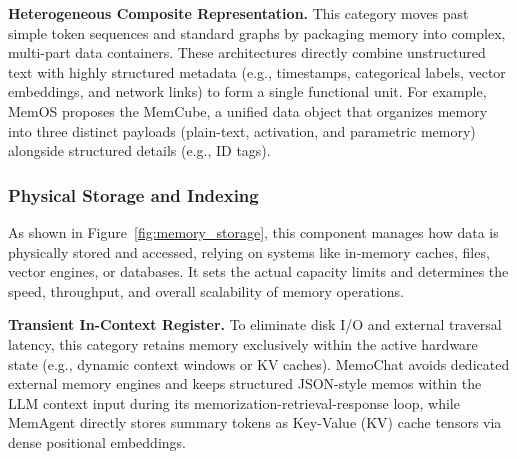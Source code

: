 
\noindent {} \textbf{Heterogeneous Composite Representation.}
This category moves past simple token sequences and standard graphs by packaging memory into complex, multi-part data containers. These architectures directly combine unstructured text with highly structured metadata (e.g., timestamps, categorical labels, vector embeddings, and network links) to form a single functional unit. For example, MemOS proposes the MemCube, a unified data object that organizes memory into three distinct payloads (plain-text, activation, and parametric memory) alongside structured details (e.g., ID tags).




\subsubsection{\textbf{Physical Storage and Indexing}}
As shown in Figure~\ref{fig:memory_storage}, this component manages how data is physically stored and accessed, relying on systems like in-memory caches, files, vector engines, or databases.
It sets the actual capacity limits and determines the speed, throughput, and overall scalability of memory operations.

\noindent {} \textbf{Transient In-Context Register.}
To eliminate disk I/O and external traversal latency, this category retains memory exclusively within the active hardware state (e.g., dynamic context windows or KV caches).
MemoChat avoids dedicated external memory engines and keeps structured JSON-style memos within the LLM context input during its memorization-retrieval-response loop, while MemAgent directly stores summary tokens as Key-Value (KV) cache tensors via dense positional embeddings.

